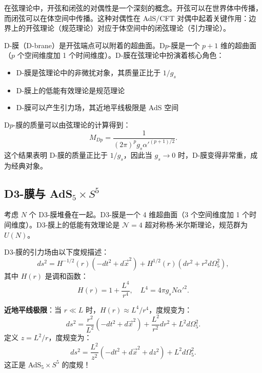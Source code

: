 在弦理论中，开弦和闭弦的对偶性是一个深刻的概念。开弦可以在世界体中传播，而闭弦可以在体空间中传播。这种对偶性在 AdS/CFT 对偶中起着关键作用：边界上的开弦理论（规范理论）对应于体空间中的闭弦理论（引力理论）。

\begin{definition}[D-膜]
D-膜（D-brane）是开弦端点可以附着的超曲面。D$p$-膜是一个 $p+1$ 维的超曲面（$p$ 个空间维度加 1 个时间维度）。D-膜在弦理论中扮演着核心角色：
\begin{itemize}
    \item D-膜是弦理论中的非微扰对象，其质量正比于 $1/g_s$
    \item D-膜上的低能有效理论是规范理论
    \item D-膜可以产生引力场，其近地平线极限是 AdS 空间
\end{itemize}
\end{definition}

\begin{property}[D-膜的质量]
D$p$-膜的质量可以由弦理论的计算得到：
\begin{equation}
    M_{Dp} = \frac{1}{(2\pi)^p g_s \alpha'^{(p+1)/2}}.
\end{equation}
这个结果表明 D-膜的质量正比于 $1/g_s$，因此当 $g_s \to 0$ 时，D-膜变得非常重，成为经典对象。
\end{property}

\subsection{D3-膜与 AdS$_5 \times S^5$}

考虑 $N$ 个 D3-膜堆叠在一起。D3-膜是一个 4 维超曲面（3 个空间维度加 1 个时间维度）。D3-膜上的低能有效理论是 $\mathcal{N}=4$ 超对称杨-米尔斯理论，规范群为 $U(N)$。

D3-膜的引力场由以下度规描述：
\begin{equation}
    ds^2 = H^{-1/2}(r) (-dt^2 + d\vec{x}^2) + H^{1/2}(r) (dr^2 + r^2 d\Omega_5^2),
\end{equation}
其中 $H(r)$ 是调和函数：
\begin{equation}
    H(r) = 1 + \frac{L^4}{r^4}, \quad L^4 = 4\pi g_s N \alpha'^2.
\end{equation}

\textbf{近地平线极限}：当 $r \ll L$ 时，$H(r) \approx L^4/r^4$，度规变为：
\begin{equation}
    ds^2 = \frac{r^2}{L^2} (-dt^2 + d\vec{x}^2) + \frac{L^2}{r^2} dr^2 + L^2 d\Omega_5^2.
\end{equation}
定义 $z = L^2/r$，度规变为：
\begin{equation}
    ds^2 = \frac{L^2}{z^2} (-dt^2 + d\vec{x}^2 + dz^2) + L^2 d\Omega_5^2.
\end{equation}
这正是 AdS$_5 \times S^5$ 的度规！

